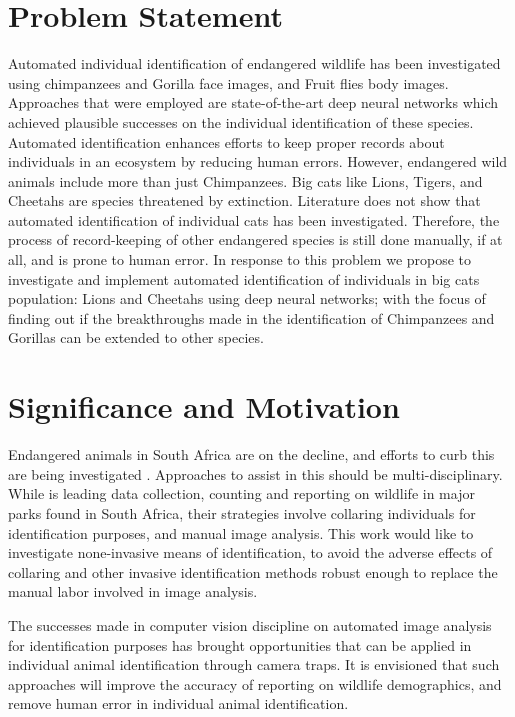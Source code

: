 \section{Problem Statement}
Automated individual identification of endangered wildlife has been investigated using chimpanzees and Gorilla face images, and Fruit flies body images. Approaches that were employed are state-of-the-art deep neural networks which achieved plausible successes on the individual identification of these species. Automated identification enhances efforts to keep proper records about individuals in an ecosystem by reducing human errors.      
However, endangered wild animals include more than just Chimpanzees. Big cats like Lions, Tigers, and Cheetahs are species threatened by extinction. Literature does not show that automated identification of individual cats has been investigated. Therefore, the process of record-keeping of other endangered species is still done manually, if at all, and is prone to human error.        
In response to this problem we propose to investigate and implement automated identification of individuals in big cats population: Lions and Cheetahs using deep neural networks; with the focus of finding out if the breakthroughs made in the identification of Chimpanzees and Gorillas can be extended to other species. 

\section{Significance and Motivation}
Endangered animals in South Africa are on the decline, and efforts to curb this are being investigated \cite{marnewick2008evaluating}. Approaches to assist in this should be multi-disciplinary. While \citeauthor{marnewick2018cheetaprob} \citeyear{marnewick2018cheetaprob} \cite{marnewick2018cheetaprob} is leading data collection, counting and reporting on wildlife in major parks found in South Africa, their strategies involve collaring individuals for identification purposes, and manual image analysis. 
This work would like to investigate none-invasive means of identification, to avoid the adverse effects of collaring and other invasive identification methods robust enough to replace the manual labor involved in image analysis. 

The successes made in computer vision discipline on automated image analysis for identification purposes has brought opportunities that can be applied in individual animal identification through camera traps. It is envisioned that such approaches will improve the accuracy of reporting on wildlife demographics, and remove human error in individual animal identification. 

